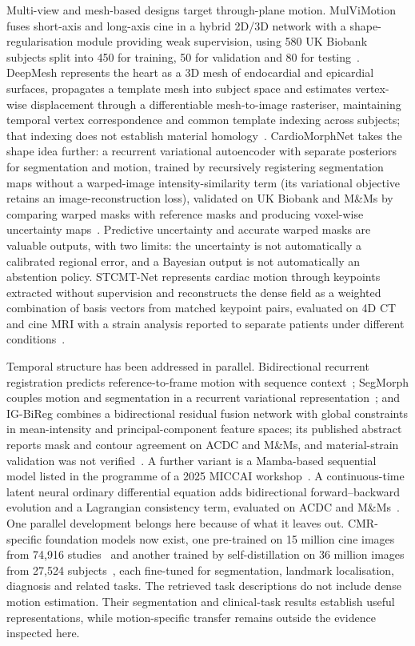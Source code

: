 Multi-view and mesh-based designs target through-plane motion. MulViMotion fuses short-axis and long-axis cine in a hybrid 2D/3D network with a shape-regularisation module providing weak supervision, using 580 UK Biobank subjects split into 450 for training, 50 for validation and 80 for testing~\cite{meng2022mulvimotion}. DeepMesh represents the heart as a 3D mesh of endocardial and epicardial surfaces, propagates a template mesh into subject space and estimates vertex-wise displacement through a differentiable mesh-to-image rasteriser, maintaining temporal vertex correspondence and common template indexing across subjects; that indexing does not establish material homology~\cite{meng2024deepmesh}. CardioMorphNet takes the shape idea further: a recurrent variational autoencoder with separate posteriors for segmentation and motion, trained by recursively registering segmentation maps without a warped-image intensity-similarity term (its variational objective retains an image-reconstruction loss), validated on UK Biobank and M\&Ms by comparing warped masks with reference masks and producing voxel-wise uncertainty maps~\cite{movahed2026cardiomorphnet}. Predictive uncertainty and accurate warped masks are valuable outputs, with two limits: the uncertainty is not automatically a calibrated regional error, and a Bayesian output is not automatically an abstention policy. STCMT-Net represents cardiac motion through keypoints extracted without supervision and reconstructs the dense field as a weighted combination of basis vectors from matched keypoint pairs, evaluated on 4D CT and cine MRI with a strain analysis reported to separate patients under different conditions~\cite{qiao2026stcmt}.

Temporal structure has been addressed in parallel. Bidirectional recurrent registration predicts reference-to-frame motion with sequence context~\cite{lu2023bireg}; SegMorph couples motion and segmentation in a recurrent variational representation~\cite{bi2025segmorph}; and IG-BiReg combines a bidirectional residual fusion network with global constraints in mean-intensity and principal-component feature spaces; its published abstract reports mask and contour agreement on ACDC and M\&Ms, and material-strain validation was not verified~\cite{jia2026igbireg}. A further variant is a Mamba-based sequential model listed in the programme of a 2025 MICCAI workshop~\cite{yin2025mcm}. A continuous-time latent neural ordinary differential equation adds bidirectional forward--backward evolution and a Lagrangian consistency term, evaluated on ACDC and M\&Ms~\cite{ruan2026latentode}. One parallel development belongs here because of what it leaves out. CMR-specific foundation models now exist, one pre-trained on 15 million cine images from 74,916 studies~\cite{fu2026cinema} and another trained by self-distillation on 36 million images from 27,524 subjects~\cite{jacob2025cmrfm}, each fine-tuned for segmentation, landmark localisation, diagnosis and related tasks. The retrieved task descriptions do not include dense motion estimation. Their segmentation and clinical-task results establish useful representations, while motion-specific transfer remains outside the evidence inspected here.

